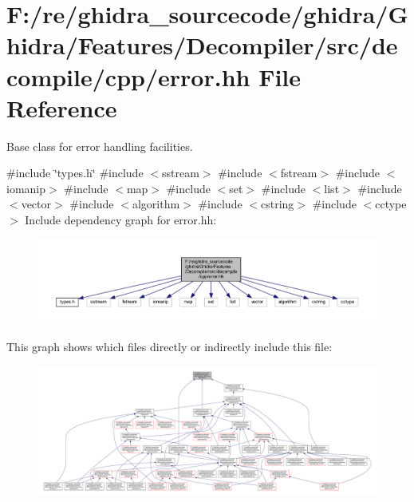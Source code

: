 \hypertarget{error_8hh}{}\section{F\+:/re/ghidra\+\_\+sourcecode/ghidra/\+Ghidra/\+Features/\+Decompiler/src/decompile/cpp/error.hh File Reference}
\label{error_8hh}


Base class for error handling facilities.  


{\ttfamily \#include \char`\"{}types.\+h\char`\"{}}\newline
{\ttfamily \#include $<$sstream$>$}\newline
{\ttfamily \#include $<$fstream$>$}\newline
{\ttfamily \#include $<$iomanip$>$}\newline
{\ttfamily \#include $<$map$>$}\newline
{\ttfamily \#include $<$set$>$}\newline
{\ttfamily \#include $<$list$>$}\newline
{\ttfamily \#include $<$vector$>$}\newline
{\ttfamily \#include $<$algorithm$>$}\newline
{\ttfamily \#include $<$cstring$>$}\newline
{\ttfamily \#include $<$cctype$>$}\newline
Include dependency graph for error.\+hh\+:
\nopagebreak
\begin{figure}[H]
\begin{center}
\leavevmode
\includegraphics[width=350pt]{error_8hh__incl}
\end{center}
\end{figure}
This graph shows which files directly or indirectly include this file\+:
\nopagebreak
\begin{figure}[H]
\begin{center}
\leavevmode
\includegraphics[width=350pt]{error_8hh__dep__incl}
\end{center}
\end{figure}
